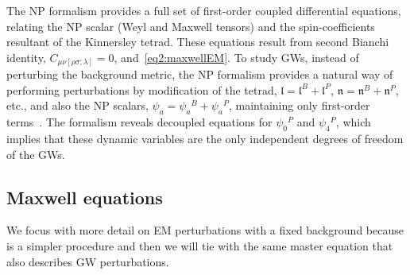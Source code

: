 The NP formalism provides a full set of first-order coupled differential equations, relating the NP scalar (Weyl and Maxwell tensors) and the spin-coefficients resultant of the Kinnersley tetrad. These equations result from second Bianchi identity, $C_{\mu\nu[\rho \sigma ; \lambda ]} = 0$, and~\eqref{eq2:maxwellEM}.
To study GWs, instead of perturbing the background metric, the NP formalism provides a natural way of performing perturbations by modification of the tetrad, $\bm{\mathfrak{l}}=\bm{\mathfrak{l}}^B+\bm{\mathfrak{l}}^P$, $\bm{\mathfrak{n}}=\bm{\mathfrak{n}}^B+\bm{\mathfrak{n}}^P$, etc., and also the NP scalars, $\psi_a = \psi_a{}^B + \psi_a{}^P$, maintaining only first-order terms~\cite{Teukolsky1973a}.
The formalism reveals decoupled equations for $\psi_0{}^P$ and $\psi_4{}^P$, which implies that these dynamic variables are the only independent degrees of freedom of the GWs.

\subsection{Maxwell equations}

We focus with more detail on EM perturbations with a fixed background because is a simpler procedure and then we will tie with the same master equation that also describes GW perturbations. 

